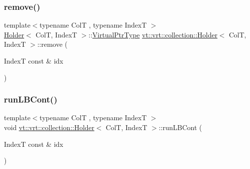 \mbox{\label{structvt_1_1vrt_1_1collection_1_1_holder_ae2cd807c3b44832151b7f7d05a07e879}} 
\subsubsection{\texorpdfstring{remove()}{remove()}}
{\footnotesize\ttfamily template$<$typename ColT , typename IndexT $>$ \\
\hyperlink{structvt_1_1vrt_1_1collection_1_1_holder}{Holder}$<$ ColT, IndexT $>$\+::\hyperlink{structvt_1_1vrt_1_1collection_1_1_holder_a04ba57a7b2c48ce6b4c90d3f3b33f43c}{Virtual\+Ptr\+Type} \hyperlink{structvt_1_1vrt_1_1collection_1_1_holder}{vt\+::vrt\+::collection\+::\+Holder}$<$ ColT, IndexT $>$\+::remove (\begin{DoxyParamCaption}\item[{IndexT const \&}]{idx }\end{DoxyParamCaption})}

\mbox{\label{structvt_1_1vrt_1_1collection_1_1_holder_a0e7fd8983ff18f85b7a2360b3732ef0a}} 
\subsubsection{\texorpdfstring{run\+L\+B\+Cont()}{runLBCont()}\hspace{0.1cm}{\footnotesize\ttfamily [1/2]}}
{\footnotesize\ttfamily template$<$typename ColT , typename IndexT $>$ \\
void \hyperlink{structvt_1_1vrt_1_1collection_1_1_holder}{vt\+::vrt\+::collection\+::\+Holder}$<$ ColT, IndexT $>$\+::run\+L\+B\+Cont (\begin{DoxyParamCaption}\item[{IndexT const \&}]{idx }\end{DoxyParamCaption})}

\mbox{\label{structvt_1_1vrt_1_1collection_1_1_holder_a4cb7b41d1bbdf4531e89ad56e24def97}} 
